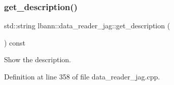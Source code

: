 \mbox{\label{classlbann_1_1data__reader__jag_a627474a612a158675918ec5b5518c80f}} 
\subsubsection{\texorpdfstring{get\+\_\+description()}{get\_description()}}
{\footnotesize\ttfamily std\+::string lbann\+::data\+\_\+reader\+\_\+jag\+::get\+\_\+description (\begin{DoxyParamCaption}{ }\end{DoxyParamCaption}) const}



Show the description. 



Definition at line 358 of file data\+\_\+reader\+\_\+jag.\+cpp.


